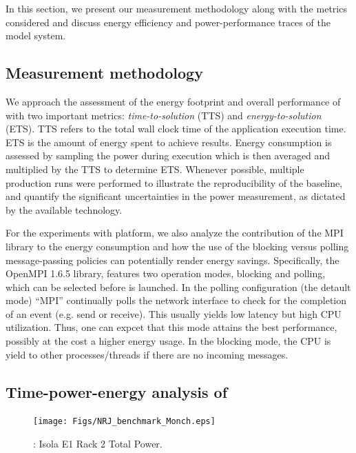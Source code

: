 In this section, we present our measurement methodology along with the
metrics considered and discuss energy efficiency and power-performance
traces of the model system.

\subsection{Measurement methodology}
\label{subsec:4.1}

We  approach  the  assessment  of  the energy  footprint  and  overall
performance   of   \cosmoart   with  two   important  metrics:
\textit{time-to-solution} (TTS) and \textit{energy-to-solution} (ETS).
TTS refers to  the total wall clock time  of the application execution
time. ETS  is the amount of  energy spent to  achieve results.  Energy
consumption  is  assessed by  sampling  the  power during execution which is then averaged and multiplied  by the TTS to determine  ETS. Whenever  possible,  multiple production  runs  were
performed  to  illustrate the  reproducibility  of  the baseline,  and
quantify the  significant uncertainties  in the power  measurement, as
dictated by the available technology.

For the experiments with \tinto platform, we also analyze the contribution of the MPI library to the energy consumption and how the use of the blocking versus polling message-passing policies can potentially render energy savings. Specifically, the OpenMPI 1.6.5 library, 
features two operation modes, blocking and polling, which can be selected before \cosmoart
is launched. In the polling configuration (the detault mode) ``MPI'' continually polls
the network interface to check for the completion of an event (e.g. send or receive).
This usually yields low latency but high CPU utilization. Thus, one can expcet that this mode 
attains the best performance, possibly at the cost a higher energy usage. In the blocking
mode, the CPU is yield to other processes/threads if there are no incoming messages.

\subsection{Time-power-energy analysis of \cosmoart}
\label{subsec:4.2}

\begin{figure}[htbf]
  \begin{center}
    \texttt{[image: Figs/NRJ\_benchmark\_Monch.eps]}
    \caption{\monch: Isola E1 Rack 2 Total Power.}
    \label{fig:1}
  \end{center}
\end{figure}

